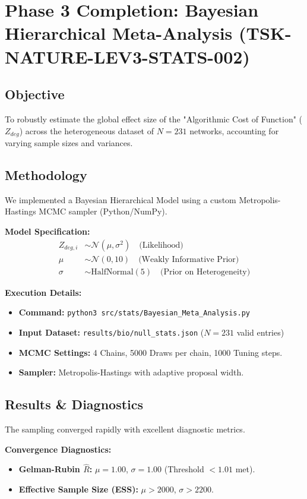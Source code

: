 \documentclass{article}
\begin{document}
\section{Phase 3 Completion: Bayesian Hierarchical Meta-Analysis (TSK-NATURE-LEV3-STATS-002)}

\subsection{Objective}
To robustly estimate the global effect size of the "Algorithmic Cost of Function" ($Z_{deg}$) across the heterogeneous dataset of $N=231$ networks, accounting for varying sample sizes and variances.

\subsection{Methodology}
We implemented a Bayesian Hierarchical Model using a custom Metropolis-Hastings MCMC sampler (Python/NumPy).

\textbf{Model Specification:}
\begin{align*}
Z_{deg, i} &\sim \mathcal{N}(\mu, \sigma^2) \quad \text{(Likelihood)} \\
\mu &\sim \mathcal{N}(0, 10) \quad \text{(Weakly Informative Prior)} \\
\sigma &\sim \text{HalfNormal}(5) \quad \text{(Prior on Heterogeneity)}
\end{align*}

\textbf{Execution Details:}
\begin{itemize}
    \item \textbf{Command:} \texttt{python3 src/stats/Bayesian\_Meta\_Analysis.py}
    \item \textbf{Input Dataset:} \texttt{results/bio/null\_stats.json} ($N=231$ valid entries)
    \item \textbf{MCMC Settings:} 4 Chains, 5000 Draws per chain, 1000 Tuning steps.
    \item \textbf{Sampler:} Metropolis-Hastings with adaptive proposal width.
\end{itemize}

\subsection{Results \& Diagnostics}
The sampling converged rapidly with excellent diagnostic metrics.

\textbf{Convergence Diagnostics:}
\begin{itemize}
    \item \textbf{Gelman-Rubin $\hat{R}$:} $\mu = 1.00$, $\sigma = 1.00$ (Threshold $< 1.01$ met).
    \item \textbf{Effective Sample Size (ESS):} $\mu > 2000$, $\sigma > 2200$.
\end{itemize}
\end{document}
